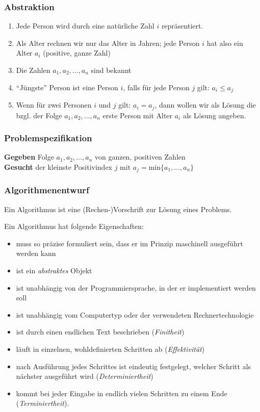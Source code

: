 \documentclass{article}
\begin{document}
\subsubsection*{Abstraktion}

\begin{enumerate}
\item Jede Person wird durch eine natürliche Zahl $i$ repräsentiert.
\item Als Alter rechnen wir nur das Alter in Jahren; jede Person $i$ hat also ein Alter $a_i$ (positive, ganze Zahl)
\item Die Zahlen $a_1, a_2, \ldots, a_n$ sind bekannt
\item ``Jüngste'' Person ist eine Person $i$, falls für jede Person $j$ gilt: $a_i \leq a_j$
\item Wenn für zwei Personen $i$ und $j$ gilt: $a_i = a_j$, dann wollen wir als Lösung die bzgl. der Folge
  $a_1, a_2, \ldots, a_n$ erste Person mit Alter $a_i$ als Lösung angeben.
\end{enumerate}

\subsubsection*{Problemspezifikation}

\textbf{Gegeben} Folge $a_1, a_2, \ldots, a_n$ von ganzen, positiven Zahlen \\
\textbf{Gesucht} der kleinste Positivindex $j$ mit $a_j = \text{min}\{a_1, \ldots, a_n\}$

\subsubsection*{Algorithmenentwurf}

Ein Algorithmus ist eine (Rechen-)Vorschrift zur Lösung eines Problems.

Ein Algorithmus hat folgende Eigenschaften:

\begin{itemize}
\item muss so präzise formuliert sein, dass er im Prinzip maschinell ausgeführt werden kann
\item ist ein \emph{abstraktes} Objekt
\item ist unabhängig von der Programmiersprache, in der er implementiert werden soll
\item ist unabhängig vom Computertyp oder der verwendeten Rechnertechnologie
\item ist durch einen endlichen Text beschrieben (\emph{Finitheit})
\item läuft in einzelnen, wohldefinierten Schritten ab (\emph{Effektivität})
\item nach Ausführung jedes Schrittes ist eindeutig festgelegt, welcher Schritt als nächster ausgeführt wird
  (\emph{Determiniertheit})
\item kommt bei jeder Eingabe in endlich vielen Schritten zu einem Ende (\emph{Terminiertheit}).
\end{itemize}
\end{document}
